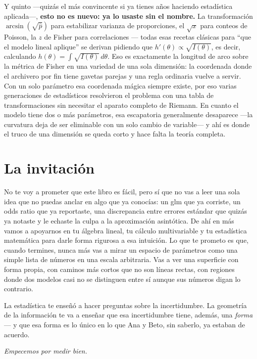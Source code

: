 Y quinto ---quizás el más convincente si ya tienes años haciendo estadística aplicada---, \textbf{esto no es nuevo: ya lo usaste sin el nombre.} La transformación $\arcsin(\sqrt{\hat p})$ para estabilizar varianza de proporciones, el $\sqrt{x}$ para conteos de Poisson, la $z$ de Fisher para correlaciones --- todas esas recetas clásicas para ``que el modelo lineal aplique'' se derivan pidiendo que $h'(\theta)\propto\sqrt{I(\theta)}$, es decir, calculando $h(\theta)=\int\sqrt{I(\theta)}\,d\theta$. Eso es exactamente la longitud de arco sobre la métrica de Fisher en una variedad de una sola dimensión: la coordenada donde el archivero por fin tiene gavetas parejas y una regla ordinaria vuelve a servir. Con un solo parámetro esa coordenada mágica siempre existe, por eso varias generaciones de estadísticos resolvieron el problema con una tabla de transformaciones sin necesitar el aparato completo de Riemann. En cuanto el modelo tiene dos o más parámetros, esa escapatoria generalmente desaparece ---la curvatura deja de ser eliminable con un solo cambio de variable--- y ahí es donde el truco de una dimensión se queda corto y hace falta la teoría completa.

\section*{La invitación}

No te voy a prometer que este libro es fácil, pero sí que no vas a leer una sola idea que no puedas anclar en algo que ya conocías: un glm que ya corriste, un odds ratio que ya reportaste, una discrepancia entre errores estándar que quizás ya notaste y le echaste la culpa a la aproximación asintótica. De ahí en más vamos a apoyarnos en tu álgebra lineal, tu cálculo multivariable y tu estadística matemática para darle forma rigurosa a esa intuición. Lo que te prometo es que, cuando termines, nunca más vas a mirar un espacio de parámetros como una simple lista de números en una escala arbitraria. Vas a ver una superficie con forma propia, con caminos más cortos que no son líneas rectas, con regiones donde dos modelos casi no se distinguen entre sí aunque sus números digan lo contrario.

La estadística te enseñó a hacer preguntas sobre la incertidumbre. La geometría de la información te va a enseñar que esa incertidumbre tiene, además, una \emph{forma} --- y que esa forma es lo único en lo que Ana y Beto, sin saberlo, ya estaban de acuerdo.

\vspace{2em}

\begin{flushright}
	\itshape \guillemotleft Empecemos por medir bien.\guillemotright
\end{flushright}

\endgroup
